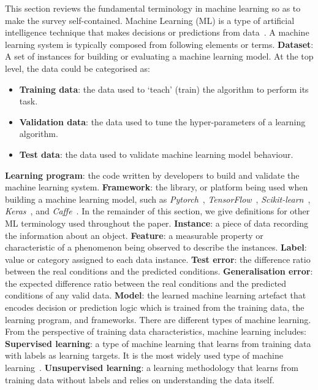 \label{sec:preliminaries}
This section reviews the fundamental terminology in machine learning so as to make the survey self-contained. 
Machine Learning (ML) is a type of artificial intelligence technique that makes decisions or predictions from data~. 
A machine learning system is typically composed from following elements or terms.
\noindent \textbf{Dataset}: A set of instances for building or evaluating a machine learning model. 
At the top level, the data could be categorised as:
\begin{itemize}
\item\textbf{Training data}: the data used to `teach' (train) the algorithm to perform its task.
\item \textbf{Validation data}: the data used to tune the hyper-parameters of a learning algorithm.
\item \textbf{Test data}: the data used to validate machine learning model behaviour. 
\end{itemize}
\noindent \textbf{Learning program}: the code written by developers to build and validate the machine learning system.
\noindent \textbf{Framework}: the library, or platform being used when building a machine learning model, such as \emph{Pytorch}~, \emph{TensorFlow}~, \emph{Scikit-learn}~, \emph{Keras}~, and \emph{Caffe}~.
In the remainder of this section, we give definitions for other ML terminology used throughout the paper.
\noindent \textbf{Instance}: a piece of data recording the information about an object. 
\noindent \textbf{Feature}: a measurable property or characteristic of a phenomenon being observed to describe the instances.
\noindent \textbf{Label}: value or category assigned to each data instance. 
\noindent \textbf{Test error}: the difference ratio between the real conditions and the predicted conditions.
\noindent \textbf{Generalisation error}: the expected difference ratio between the real conditions and the predicted conditions of any valid data.
\noindent \textbf{Model}: the learned machine learning artefact that encodes decision or prediction logic which is trained from the training data, the learning program, and frameworks. 
There are different types of machine learning.
From the perspective of training data characteristics, machine learning includes:
\noindent \textbf{Supervised learning}: a type of machine learning that learns from training data with labels as learning targets. 
It is the most widely used type of machine learning~.
\noindent \textbf{Unsupervised learning}: a learning methodology that learns from training data without labels and relies on understanding the data itself.
